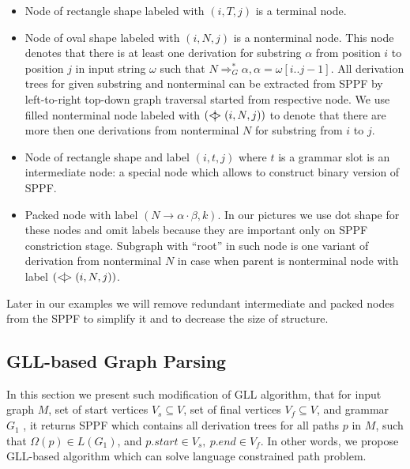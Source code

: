 \begin{itemize}
    \item Node of rectangle shape labeled with $(i, T, j)$ is a terminal node.     
    \item Node of oval shape labeled with $(i, N, j)$ is a nonterminal node. 
    This node denotes that there is at least one derivation for substring $\alpha$ from position $i$ to position $j$ in input string $\omega$ such that $N \Rightarrow^*_G \alpha, \alpha = \omega[i..j-1] $.
    All derivation trees for given substring and nonterminal can be extracted from SPPF by left-to-right top-down graph traversal started from respective node. 
    We use filled nonterminal node labeled with $(<\mkern-11mu | \mkern-11mu> (i, N, j))$ to denote that there are more then one derivations from nonterminal $N$ for substring from $i$ to $j$.
    \item Node of rectangle shape and label $(i,t,j)$ where $t$ is a grammar slot is an intermediate node: a special node which allows to construct binary version of SPPF.
    \item Packed node with label $(N \rightarrow \alpha \cdot \beta, k)$. In our pictures we use dot shape for these nodes and omit labels because they are important only on SPPF constriction stage.
    Subgraph with ``root'' in such node is one variant of derivation from nonterminal $N$ in case when parent is nonterminal node with label $(<\mkern-9mu | \mkern-9mu> (i, N, j))$.

\end{itemize}

Later in our examples we will remove redundant intermediate and packed nodes from the SPPF to simplify it and to decrease the size of structure.

\subsection{GLL-based Graph Parsing}

In this section we present such modification of GLL algorithm, that for input graph $M$, set of start vertices $V_s\subseteq V$, set of final vertices $V_f\subseteq V$, and grammar $G_1$
, it returns SPPF which contains all derivation trees for all paths $p$ in $M$, such that $\Omega(p) \in L(G_1)$, and $p.start \in V_s,\ p.end \in V_f$.
In other words, we propose GLL-based algorithm which can solve language constrained path problem.

